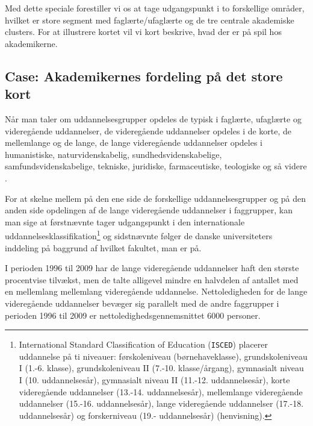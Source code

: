 Med dette speciale forestiller vi os at tage udgangspunkt i to forskellige områder, hvilket er store segment med faglærte/ufaglærte og de tre centrale akademiske clusters. For at illustrere kortet vil vi kort beskrive, hvad der er på spil hos akademikerne.



\subsection{Case: Akademikernes fordeling på det store kort \label{}}

Når man taler om uddannelsesgrupper opdeles de typisk i faglærte, ufaglærte og videregående uddannelser, de videregående uddannelser opdeles i de korte, de mellemlange og de lange, de lange videregående uddannelser opdeles i humanistiske, naturvidenskabelig, sundhedsvidenskabelige, samfundsvidenskabelige, tekniske, juridiske, farmaceutiske, teologiske og så videre \parencite{Groes2014}. 

For at skelne mellem på den ene side de forskellige uddannelsesgrupper og på den anden side opdelingen af de lange videregående uddannelser i faggrupper, kan man sige at førstnævnte tager udgangspunkt i den internationale uddannelsesklassifikation\footnote{International Standard Classification of Education (\texttt{ISCED}) placerer uddannelse på ti niveauer: førskoleniveau (børnehaveklasse), grundskoleniveau I (1.-6. klasse), grundskoleniveau II (7.-10. klasse/årgang), gymnasialt niveau I (10. uddannelsesår), gymnasialt niveau II (11.-12. uddannelsesår), korte videregående uddannelser (13.-14. uddannelsesår), mellemlange videregående uddannelser (15.-16. uddannelsesår), lange videregående uddannelser (17.-18. uddannelsesår) og forskerniveau (19.- uddannelsesår) (henvisning).} og sidstnævnte følger de danske universiteters inddeling på baggrund af hvilket fakultet, man er på. %

I perioden 1996 til 2009 har de lange videregående uddannelser haft den største  procentvise tilvækst, men de talte alligevel mindre en halvdelen af antallet med en mellemlang mellemlang videregående uddannelse. %
Nettoledigheden for de lange videregående uddannelser bevæger sig parallelt med de andre faggrupper i perioden 1996 til 2009 er nettoledighedsgennemsnittet 6000 personer. 

